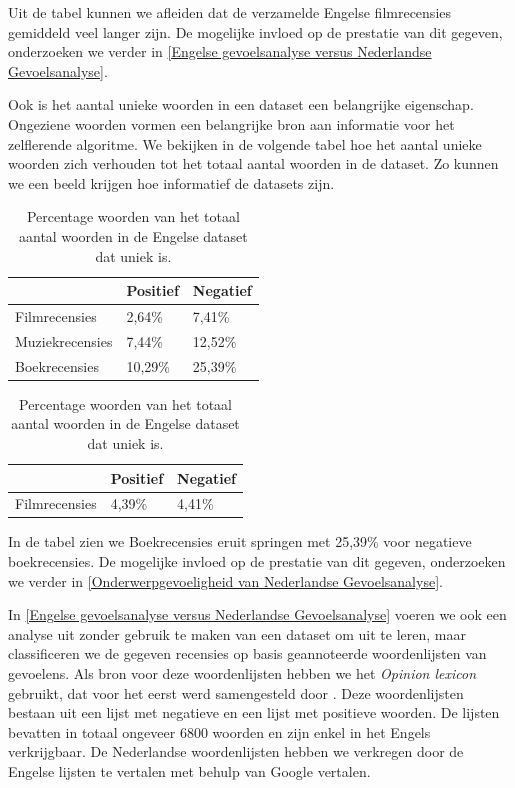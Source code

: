Uit de tabel kunnen we afleiden dat de verzamelde Engelse filmrecensies gemiddeld veel langer zijn. De mogelijke invloed op de prestatie van dit gegeven, onderzoeken we verder in \ref{Engelse gevoelsanalyse versus Nederlandse Gevoelsanalyse}.


Ook is het aantal unieke woorden in een dataset een belangrijke eigenschap. Ongeziene woorden vormen een belangrijke bron aan informatie voor het zelflerende algoritme. We bekijken in de volgende tabel hoe het aantal unieke woorden zich verhouden tot het totaal aantal woorden in de dataset. Zo kunnen we een beeld krijgen hoe informatief de datasets zijn.
\begin{table}[h]
\centering
\setlength\tabcolsep{2pt}
\begin{minipage}[t]{0.48\textwidth}
\centering
\begin{tabular}{l|l|l|}
\cline{2-3}
                                      & Positief & Negatief \\ \hline
\multicolumn{1}{|l|}{Filmrecensies}   & 2,64\%   & 7,41\%   \\ \hline
\multicolumn{1}{|l|}{Muziekrecensies} & 7,44\%   & 12,52\%  \\ \hline
\multicolumn{1}{|l|}{Boekrecensies}   & 10,29\%  & 25,39\%  \\ \hline
\end{tabular}

\caption{Percentage woorden van het totaal aantal woorden in de Nederlandse dataset dat uniek is.} 
\label{percentage recensies}
\end{minipage}%
\hfill
\begin{minipage}[t]{0.48\textwidth}
\centering
\begin{tabular}{l|l|l|}
\cline{2-3}
                                    & Positief & Negatief \\ \hline
\multicolumn{1}{|l|}{Filmrecensies} & 4,39\%   & 4,41\%   \\ \hline
\end{tabular}
\caption{Percentage woorden van het totaal aantal woorden in de Engelse dataset dat uniek is.} 
\end{minipage}
\end{table}

In de tabel zien we Boekrecensies eruit springen met 25,39\% voor negatieve boekrecensies. De mogelijke invloed op de prestatie van dit gegeven, onderzoeken we verder in \ref{Onderwerpgevoeligheid van Nederlandse Gevoelsanalyse}.

In \ref{Engelse gevoelsanalyse versus Nederlandse Gevoelsanalyse} voeren we ook een analyse uit zonder gebruik te maken van een dataset om uit te leren, maar classificeren we de gegeven recensies op basis geannoteerde woordenlijsten van gevoelens.  
Als bron voor deze woordenlijsten hebben we het \textit{Opinion lexicon} gebruikt, dat voor het eerst werd samengesteld door \cite{hu2004mining}. Deze woordenlijsten bestaan uit een lijst met negatieve en een lijst met positieve woorden. De lijsten bevatten in totaal ongeveer 6800 woorden en zijn enkel in het Engels verkrijgbaar. De Nederlandse woordenlijsten hebben we verkregen door de Engelse lijsten te vertalen met behulp van Google vertalen.\\

